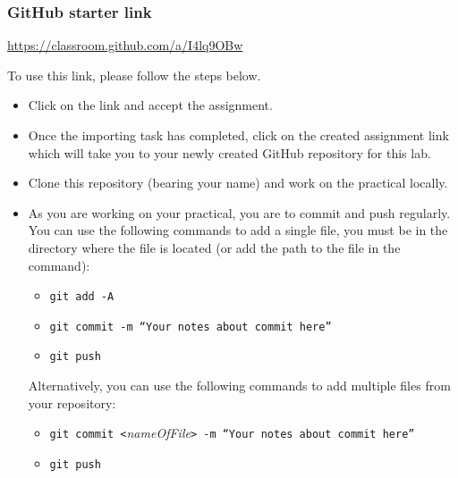 

\long{}






\subsubsection*{GitHub starter link}
\begin{center}
\color{red} \url{https://classroom.github.com/a/I4lq9OBw} \color{black}
\end{center}



To use this link, please follow the steps below.
\begin{itemize}
	\item Click on the link and accept the assignment.
	\item Once the importing task has completed, click on the created assignment link which will take you to your newly created GitHub repository for this lab.
	\item Clone this repository (bearing your name) and work on the practical locally.
	\item As you are working on your practical, you are to commit and push regularly. You can use the following commands to add a single file, you must be in the directory where the file is located (or add the path to the file in the command):
		\begin{itemize}
		\item {\tt git add -A}
		\item {\tt git commit -m ``Your notes about commit here''}
		\item {\tt git push}
	\end{itemize}

	Alternatively, you can use the following commands to add multiple files from your repository:
	\begin{itemize}
		\item {\tt git commit <}\emph{nameOfFile}\tt{> -m ``Your notes about commit here''}
		\item {\tt git push}
	\end{itemize}
\end{itemize}



